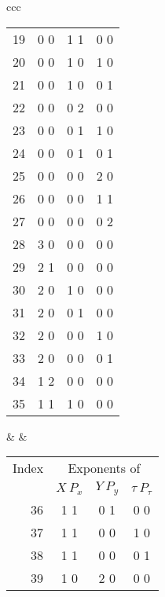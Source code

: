 {\begin{center}
\begin{tabular}{ccc}
\begin{tabular}{rccc}
19\hspace*{.125in}&0 0&1 1&0 0\\
20\hspace*{.125in}&0 0&1 0&1 0\\
21\hspace*{.125in}&0 0&1 0&0 1\\
22\hspace*{.125in}&0 0&0 2&0 0\\
23\hspace*{.125in}&0 0&0 1&1 0\\
24\hspace*{.125in}&0 0&0 1&0 1\\
25\hspace*{.125in}&0 0&0 0&2 0\\
26\hspace*{.125in}&0 0&0 0&1 1\\
27\hspace*{.125in}&0 0&0 0&0 2\\
28\hspace*{.125in}&3 0&0 0&0 0\\
29\hspace*{.125in}&2 1&0 0&0 0\\
30\hspace*{.125in}&2 0&1 0&0 0\\
31\hspace*{.125in}&2 0&0 1&0 0\\
32\hspace*{.125in}&2 0&0 0&1 0\\
33\hspace*{.125in}&2 0&0 0&0 1\\
34\hspace*{.125in}&1 2&0 0&0 0\\
35\hspace*{.125in}&1 1&1 0&0 0
\end{tabular} & \hspace*{1in} &
\begin{tabular}{rccc}
\multicolumn{1}{c}{Index} &
\multicolumn{3}{c}{Exponents of}\\
&$X\:P_x$&$Y\:P_y$&$\tau\:P_\tau$\\
36\hspace*{.125in}&1 1&0 1&0 0\\
37\hspace*{.125in}&1 1&0 0&1 0\\
38\hspace*{.125in}&1 1&0 0&0 1\\
39\hspace*{.125in}&1 0&2 0&0 0\\

\end{tabular}
\end{tabular}
\end{center}}
